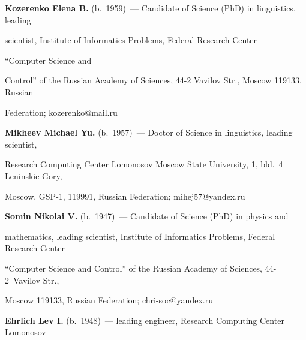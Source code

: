 \textbf{Kozerenko Elena B.} (b.\ 1959)~---  Candidate of Science (PhD) in linguistics, leading 


scientist, Institute of Informatics Problems, Federal Research Center 


``Computer Science and 


Control'' of the Russian Academy of Sciences, 44-2 Vavilov Str., Moscow 119133, Russian 


Federation; \mbox{kozerenko@mail.ru}










\pagebreak





\noindent


\textbf{Mikheev Michael Yu.} (b.\ 1957)~--- Doctor of Science in linguistics, leading scientist, 


Research Computing Center Lomonosov Moscow State University, 1, bld.~4 Leninskie Gory, 


Moscow, GSP-1, 119991, Russian Federation;  \mbox{mihej57@yandex.ru}





\vspace*{6pt}





\noindent


\textbf{Somin Nikolai V.} (b.\ 1947)~--- Candidate of Science (PhD) in physics and 


mathematics, leading scientist, Institute of Informatics Problems, Federal Research Center 


``Computer Science and Control'' of the Russian Academy of Sciences, 44-2~Vavilov Str., 


Moscow 119133, Russian Federation; \mbox{chri-soc@yandex.ru}





\vspace*{6pt}





\noindent


\textbf{Ehrlich Lev I.} (b.\ 1948)~--- leading engineer, Research Computing Center Lomonosov 


